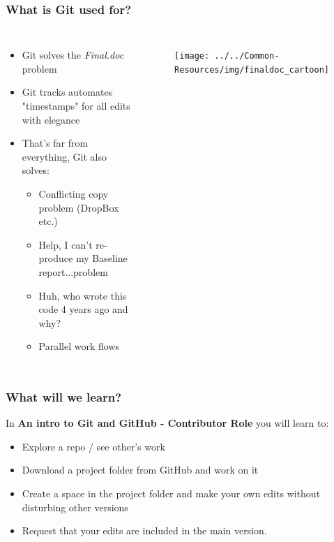 \documentclass[aspectratio=169]{beamer} %
\begin{document}
\begin{frame}
\frametitle{What is Git used for?}

	\begin{columns}[c]

		\begin{itemize}
			\item Git solves the \textit{Final.doc} problem
			\item Git tracks automates "timestamps" for all edits with elegance
			\item That's far from everything, Git also solves:
			\begin{itemize}
				\item <2->Conflicting copy problem (DropBox etc.)
				\item <2->Help, I can't re-produce my Baseline report...problem
				\item <2->Huh, who wrote this code 4 years ago and why?
				\item <2->Parallel work flows
			\end{itemize}
		\end{itemize}

		\begin{figure}
			\centering
			\texttt{[image: ../../Common-Resources/img/finaldoc\_cartoon]}
			\label{fig:finaldoccartoon}
		\end{figure}

	\end{columns}
\end{frame}




\begin{frame}
\frametitle{What will we learn?}

	In \textbf{An intro to Git and GitHub - Contributor Role} you will learn to:

	\begin{itemize}
		\item Explore a repo / see other's work
		\item Download a project folder from GitHub and work on it
		\item Create a space in the project folder and make your own edits without disturbing other versions
		\item Request that your edits are included in the main version.
	\end{itemize}

\end{frame}
\end{document}
